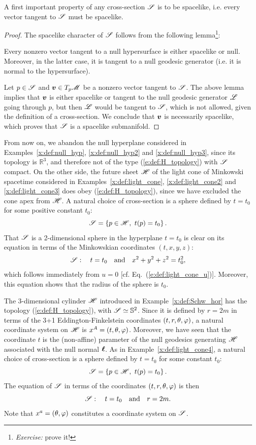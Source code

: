A first important property of any cross-section $\mathscr{S}$ is to be spacelike,
i.e. every vector
tangent to $\mathscr{S}$ must be spacelike.
\begin{proof}
The spacelike character of $\mathscr{S}$ follows from the following
lemma\footnote{\emph{Exercise:} prove it!}:
\begin{greybox}
Every nonzero vector tangent to a null hypersurface is either spacelike or null.
Moreover, in the latter case, it is tangent to a null geodesic generator (i.e. it is normal
to the hypersurface).
\end{greybox}
Let $p \in \mathscr{S}$ and $\bm{v}\in T_p\mathscr{M}$ be a nonzero vector tangent to $\mathscr{S}$.
The above lemma implies that $\bm{v}$ is either spacelike or tangent to the
null geodesic generator $\mathscr{L}$ going through $p$, but then $\mathscr{L}$ would be tangent to $\mathscr{S}$,
which is not allowed, given the definition of a cross-section. We conclude
that $\bm{v}$ is necessarily spacelike, which proves that $\mathscr{S}$ is a spacelike
submanifold.
\end{proof}

\begin{example} \label{x:def:light_cone4}
From now on, we abandon the null hyperplane considered in Examples~\ref{x:def:null_hyp},
\ref{x:def:null_hyp2} and \ref{x:def:null_hyp3}, since its topology is $\mathbb{R}^3$,
and therefore not of the type (\ref{e:def:H_topology}) with $\mathscr{S}$ compact.
On the other side, the future sheet $\mathscr{H}$ of the light cone of Minkowski spacetime considered in Examples~\ref{x:def:light_cone},
\ref{x:def:light_cone2} and \ref{x:def:light_cone3} does obey (\ref{e:def:H_topology}),
since we have excluded the cone apex from $\mathscr{H}$.
A natural choice of cross-section is a sphere defined by $t=t_0$ for some positive constant $t_0$:
\[
    \mathscr{S} = \left\{ p \in \mathscr{H},\  t(p) = t_0 \right\} .
\]
That $\mathscr{S}$ is a 2-dimensional sphere in the hyperplane $t=t_0$ is clear on its equation in terms
of the Minkowskian coordinates $(t,x,y,z)$:
\[
\mathscr{S}: \quad t=t_0 \quad\mbox{and}\quad x^2+y^2+z^2 = t_0^2,
\]
which follows immediately from $u=0$
[cf. Eq.~(\ref{e:def:light_cone_u})]. Moreover, this equation shows that the
radius of the sphere is $t_0$.
\end{example}

\begin{example} \label{x:def:Schw_hor4}
The 3-dimensional cylinder $\mathscr{H}$ introduced in Example~\ref{x:def:Schw_hor}
has the topology (\ref{e:def:H_topology}), with $\mathscr{S}\simeq \mathbb{S}^2$.
Since it is defined
by $r=2m$ in terms of the 3+1 Eddington-Finkelstein coordinates $(t,r,\theta,\varphi)$,
a natural coordinate system on $\mathscr{H}$ is $x^A = (t,\theta,\varphi)$. Moreover, we
have seen that the coordinate $t$ is the (non-affine) parameter of the null
geodesics generating $\mathscr{H}$ associated with the null normal $\bm{\ell}$.
As in Example~\ref{x:def:light_cone4}, a natural choice of cross-section is a
sphere defined by $t=t_0$ for some constant $t_0$:
\[
    \mathscr{S} = \left\{ p \in \mathscr{H},\  t(p) = t_0 \right\} .
\]
The equation of $\mathscr{S}$ in terms of the coordinates $(t,r,\theta,\varphi)$ is then
\[
    \mathscr{S}: \quad t=t_0 \quad\mbox{and}\quad r = 2m .
\]
Note that $x^a=(\theta,\varphi)$ constitutes a coordinate system on $\mathscr{S}$.
\end{example}

